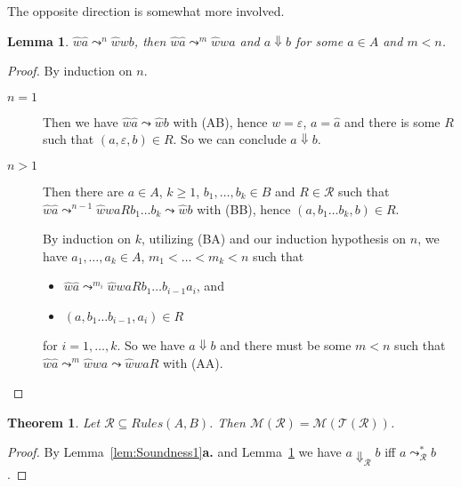 \documentclass[a4paper,final,preprint,sort&compress]{elsarticle}
\newtheorem{theorem}[definition]{Theorem}
\newtheorem{lemma}[definition]{Lemma}
\newcommand{\M}{\ensuremath{\mathcal{M}}}
\newcommand{\R}{\ensuremath{\mathcal{R}}}
\newcommand{\T}{\ensuremath{\mathcal{T}}}
\newcommand{\Rules}{\ensuremath{\mathit{Rules}}}
\begin{document}
The opposite direction is somewhat more involved.

\begin{lemma} \label{lem:Soundness3}
  \mbox{$\hat{w}\hat{a} \leadsto^n \hat{w}wb$}, then
  \mbox{$\hat{w}\hat{a} \leadsto^m \hat{w}wa$} and \mbox{$a \Downarrow b$}
  for some $a \in A$ and \mbox{$m < n$}.
\end{lemma}

\begin{proof}
  By induction on $n$.
  \begin{description}
  \item[$n=1$] 

    Then we have \mbox{$\hat{w}\hat{a} \leadsto \hat{w}b$} with \textsc{(AB)}, hence
    $w = \varepsilon$, $a = \hat{a}$ and there is some $R$ such that \mbox{$(a,\varepsilon,b) \in R$}.
    So we can conclude $a \Downarrow b$.

  \item[$n > 1$]

    Then there are $a \in A$, $k \ge 1$, $b_1,\ldots,b_k \in B$ and $R \in \R$ such that
    \mbox{$\hat{w}\hat{a} \leadsto^{n-1} \hat{w}waRb_1 \ldots b_k \leadsto \hat{w}b$}
    with \textsc{(BB)}, hence \mbox{$(a,b_1 \ldots b_k,b) \in R$}.

    By induction on $k$, utilizing \textsc{(BA)} and our induction hypothesis on $n$, we have
    \mbox{$a_1,\ldots,a_k \in A$}, \mbox{$m_1 < \ldots < m_k < n$} such that
    \begin{itemize}
    \item $\hat{w}\hat{a} \leadsto^{m_i} \hat{w}waRb_1 \ldots b_{i-1}a_i$, and
    \item $(a,b_1 \ldots b_{i-1},a_i) \in R$
    \end{itemize}
    for $i = 1,\ldots,k$. So we have \mbox{$a \Downarrow b$} and there must be some \mbox{$m < n$}
    such that \mbox{$\hat{w}\hat{a} \leadsto^m \hat{w}wa \leadsto \hat{w}waR$} with \textsc{(AA)}.
    
  \end{description}
\end{proof}

\begin{theorem}
  Let \mbox{$\R \subseteq \Rules(A,B)$}. Then \mbox{$\M\left(\R\right) = \M\left(\T\left(\R\right)\right)$}.
\end{theorem}

\begin{proof}
  By Lemma~\ref{lem:Soundness1}\textbf{a.} and Lemma~\ref{lem:Soundness3} we have
  \mbox{$a \Downarrow_\R b$} iff \mbox{$a \leadsto^*_\R b$}.
\end{proof}
\end{document}
